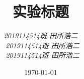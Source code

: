 \documentclass[titlepage, UTF8,12pt,a4paper]{ctexart}
\title{实验标题}
\author{\textsl{
2019114514班 \quad 田所浩二 \quad 2019114514\\ \ 
2019114514班 \quad 田所浩二 \quad 2019114514\\ \ 
2019114514班 \quad 田所浩二 \quad 2019114514
}}
\date{\today}
\newcommand{\chap}[1]{}
\begin{document}
\pagestyle{empty}


\clearpage
\tableofcontents
\clearpage

\pagestyle{fancy}
\setcounter{page}{1}

\chap{chap1}
\chap{chap2}
\chap{chap3}
\end{document}
